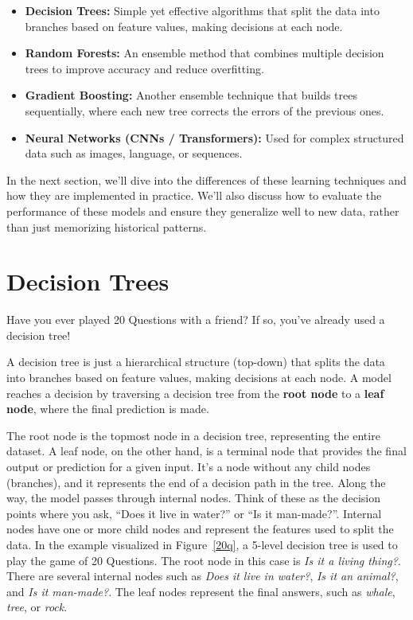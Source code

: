 \begin{itemize}
  \item \textbf{Decision Trees:} Simple yet effective algorithms that split the data into branches based on feature values, making decisions at each node.
  \item \textbf{Random Forests:} An ensemble method that combines multiple decision trees to improve accuracy and reduce overfitting.
  \item \textbf{Gradient Boosting:} Another ensemble technique that builds trees sequentially, where each new tree corrects the errors of the previous ones.
  \item \textbf{Neural Networks (CNNs / Transformers):} Used for complex structured data such as images, language, or sequences.
\end{itemize}

In the next section, we'll dive into the differences of these learning techniques and how they are implemented in practice. We'll also discuss how to evaluate the performance of these models and ensure they generalize well to new data, rather than just memorizing historical patterns.

\section{Decision Trees}\label{sec:decision-trees}

Have you ever played 20 Questions with a friend? If so, you've already used a decision tree!

A decision tree is just a hierarchical structure (top-down) that splits the data into branches based on feature values, making decisions at each node. 
A model reaches a decision by traversing a decision tree from the \textbf{root node} to a \textbf{leaf node}, where the final prediction is made.

The root node is the topmost node in a decision tree, representing the entire dataset. 
A leaf node, on the other hand, is a terminal node that provides the final output or prediction for a given input. 
It's a node without any child nodes (branches), and it represents the end of a decision path in the tree.
Along the way, the model passes through internal nodes. Think of these as the decision points where you ask, ``Does it live in water?'' or ``Is it man-made?''. 
Internal nodes have one or more child nodes and represent the features used to split the data.
In the example visualized in Figure~\ref{20q}, a 5-level decision tree is used to play the game of 20 Questions. 
The root node in this case is \textit{Is it a living thing?}.
There are several internal nodes such as \textit{Does it live in water?}, \textit{Is it an animal?}, and \textit{Is it man-made?}. 
The leaf nodes represent the final answers, such as \textit{whale}, \textit{tree}, or \textit{rock}.

